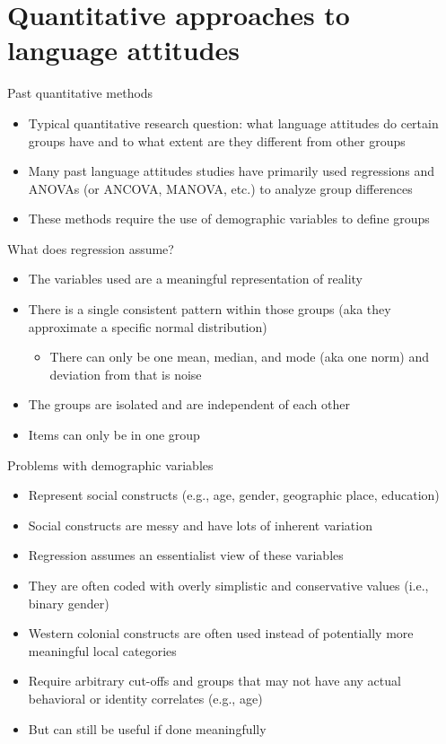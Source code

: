 \documentclass[10pt]{beamer}
\begin{document}
\section{Quantitative approaches to language attitudes}
\begin{frame}{Past quantitative methods}
\begin{itemize}
\item Typical quantitative research question: what language attitudes do certain groups have and to what extent are they different from other groups
\item Many past language attitudes studies have primarily used regressions and ANOVAs (or ANCOVA, MANOVA, etc.) to analyze group differences
\item These methods require the use of demographic variables to define groups
\end{itemize}
\end{frame}

\begin{frame}{What does regression assume?}
\begin{itemize}
\item The variables used are a meaningful representation of reality
\item There is a single consistent pattern within those groups (aka they approximate a specific normal distribution)
\begin{itemize}
\item There can only be one mean, median, and mode (aka one norm) and deviation from that is noise
\end{itemize}
\item The groups are isolated and are independent of each other
\item Items can only be in one group
\end{itemize}
\end{frame}

\begin{frame}{Problems with demographic variables}
\begin{itemize}
\item Represent social constructs (e.g., age, gender, geographic place, education)
\item Social constructs are messy and have lots of inherent variation
\item Regression assumes an essentialist view of these variables
\item They are often coded with overly simplistic and conservative values (i.e., binary gender)
\item Western colonial constructs are often used instead of potentially more meaningful local categories
\item Require arbitrary cut-offs and groups that may not have any actual behavioral or identity correlates (e.g., age)
\item But can still be useful if done meaningfully
\end{itemize}
\end{frame}
\end{document}
